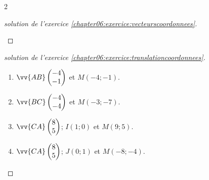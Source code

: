 \documentclass[main.tex]{subfiles}
\begin{document}
\begin{multicols}{2}
\begin{proof}[solution de l'exercice \ref{chapter06:exercice:vecteurscoordonnees}]
\begin{enumerate}[leftmargin=*,label=\alph*)]
		\end{enumerate} 
	\end{proof}
	\begin{proof}[solution de l'exercice \ref{chapter06:exercice:translationcoordonnees}]\hfill 
		\begin{enumerate}[leftmargin=*,label=\alph*)] 
			\item  $\vv{AB}\begin{pmatrix}
				-4\\-1
			\end{pmatrix}$ et $M(-4;-1)$.
			\item  $\vv{BC}\begin{pmatrix}
				-4\\-4
			\end{pmatrix}$ et $M(-3;-7)$.
			\item  $\vv{CA}\begin{pmatrix}
				8\\5
			\end{pmatrix}$; $I(1;0)$ et $M(9;5)$.
			\item $\vv{CA}\begin{pmatrix}
				8\\5
			\end{pmatrix}$; $J(0;1)$ et $M(-8;-4)$.
		\end{enumerate} 
	\end{proof} 
\end{multicols}
\end{document}
